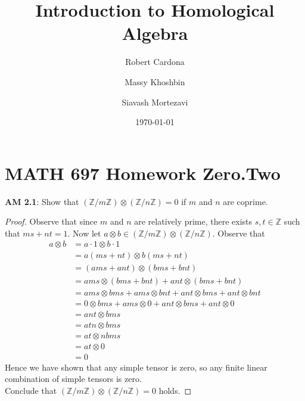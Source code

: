 \documentclass[8pt]{amsart}
\theoremstyle{plain}%
\theoremstyle{definition}
\theoremstyle{remark}
\numberwithin{equation}{section}
\newcommand{\Z}{\mathbb{Z}}
\begin{document}
\title[MATH 697]{Introduction to Homological Algebra}


\author{
	Robert Cardona %
	\and
	Massy Khoshbin %
	\and
	Siavash Mortezavi %
}


\address{Department of Mathematics \\ California State University Long Beach}

\date{\today}


\maketitle

\setcounter{section}{-1}
\section{MATH 697 Homework Zero.Two}


\textbf{ AM 2.1}: Show that $(\Z/m\Z) \otimes (\Z/n\Z) = 0$ if $m$ and $n$ are coprime.
	\begin{proof}
		Observe that since $m$ and $n$ are relatively prime, there exists $s, t \in \Z$ such that $ms + nt = 1$. Now let $a \otimes b \in (\Z/m\Z) \otimes (\Z/n\Z)$. Observe that
		\begin{align*}
			a \otimes b &= a \cdot 1 \otimes b \cdot 1\\
			&= a (ms + nt) \otimes b (ms + nt)\\
			&= (ams + ant) \otimes (bms + bnt)\\
			&= ams \otimes (bms + bnt) + ant \otimes (bms + bnt)\\
			&= ams \otimes bms + ams \otimes bnt + ant \otimes bms + ant \otimes bnt\\
			&= 0 \otimes bms + ams \otimes 0 + ant \otimes bms + ant \otimes 0\\
			&= ant \otimes bms\\
			&= atn \otimes bms\\
			&= at \otimes nbms\\
			&= at \otimes 0\\
			&= 0
		\end{align*}
		Hence we have shown that any simple tensor is zero, so any finite linear combination of simple tensors is zero.\\

		Conclude that  $(\Z/m\Z) \otimes (\Z/n\Z) = 0$ holds.
	\end{proof}
\end{document}

